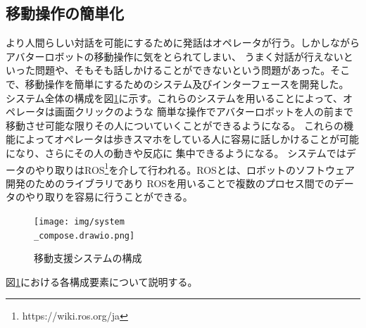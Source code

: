 \documentclass{kuisthesis}
\begin{document}
\subsection{移動操作の簡単化}
より人間らしい対話を可能にするために発話はオペレータが行う。しかしながらアバターロボットの移動操作に気をとられてしまい、
うまく対話が行えないといった問題や、そもそも話しかけることができないという問題があった。そこで、移動操作を簡単にするためのシステム及びインターフェースを開発した。
システム全体の構成を図\ref{pic:systemcompose}に示す。これらのシステムを用いることによって、オペレータは画面クリックのような
簡単な操作でアバターロボットを人の前まで移動させ可能な限りその人についていくことができるようになる。
これらの機能によってオペレータは歩きスマホをしている人に容易に話しかけることが可能になり、さらにその人の動きや反応に
集中できるようになる。
システムではデータのやり取りはROS\footnote{https://wiki.ros.org/ja}を介して行われる。ROSとは、ロボットのソフトウェア開発のためのライブラリであり
ROSを用いることで複数のプロセス間でのデータのやり取りを容易に行うことができる。
\begin{figure}[h]
  
  \texttt{[image: img/system\\\_compose.drawio.png]}
  \caption{移動支援システムの構成}
  \label{pic:systemcompose}

\end{figure}
図\ref{pic:systemcompose}における各構成要素について説明する。
\end{document}
